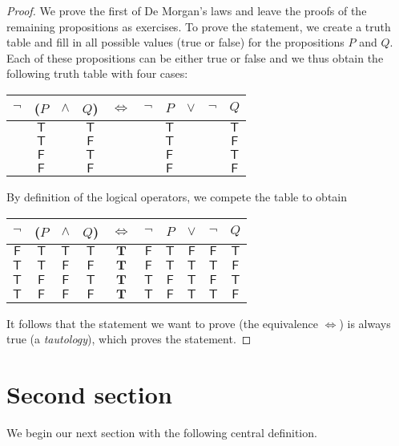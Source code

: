 \documentclass{tstextbook}
\begin{document}
\begin{proof}
  \newcommand{\T}{\mathsf{T}}
  \newcommand{\TT}{\mathbf{T}}
  \renewcommand{\F}{\mathsf{F}}
  We prove the first of De Morgan's laws and leave the proofs of
  the remaining propositions as exercises. To prove the statement,
  we create a truth table and fill in all possible values (true or
  false) for the propositions $P$ and $Q$. Each of these propositions
  can be either true or false and we thus obtain the following truth
  table with four cases:
  \begin{center}
    \begin{tabular}{cccccccccc}
      $\lnot$ & ($P$ & $\land$ & $Q$) & $\Leftrightarrow$ & $\lnot$ & $P$ & $\lor$ & $\lnot$ & $Q$ \\
      \midrule
      & $\T$ && $\T$ &&& $\T$ &&& $\T$ \\
      & $\T$ && $\F$ &&& $\T$ &&& $\F$ \\
      & $\F$ && $\T$ &&& $\F$ &&& $\T$ \\
      & $\F$ && $\F$ &&& $\F$ &&& $\F$
    \end{tabular}
  \end{center}
  By definition of the logical operators, we compete the table to obtain
  \begin{center}
    \begin{tabular}{cccccccccc}
      $\lnot$ & ($P$ & $\land$ & $Q$) & $\Leftrightarrow$ & $\lnot$ & $P$ & $\lor$ & $\lnot$ & $Q$ \\
      \midrule
      $\F$ & $\T$ & $\T$ & $\T$ & $\TT$ & $\F$ & $\T$ & $\F$ & $\F$& $\T$ \\
      $\T$ & $\T$ & $\F$ & $\F$ & $\TT$ & $\F$ & $\T$ & $\T$ & $\T$& $\F$ \\
      $\T$ & $\F$ & $\F$ & $\T$ & $\TT$ & $\T$ & $\F$ & $\T$ & $\F$& $\T$ \\
      $\T$ & $\F$ & $\F$ & $\F$ & $\TT$ & $\T$ & $\F$ & $\T$ & $\T$& $\F$
    \end{tabular}
  \end{center}
  It follows that the statement we want to prove (the equivalence $\Leftrightarrow$)
  is always true (a \emph{tautology}), which proves the statement.
\end{proof}

\section{Second section}

We begin our next section with the following central definition.
\end{document}
